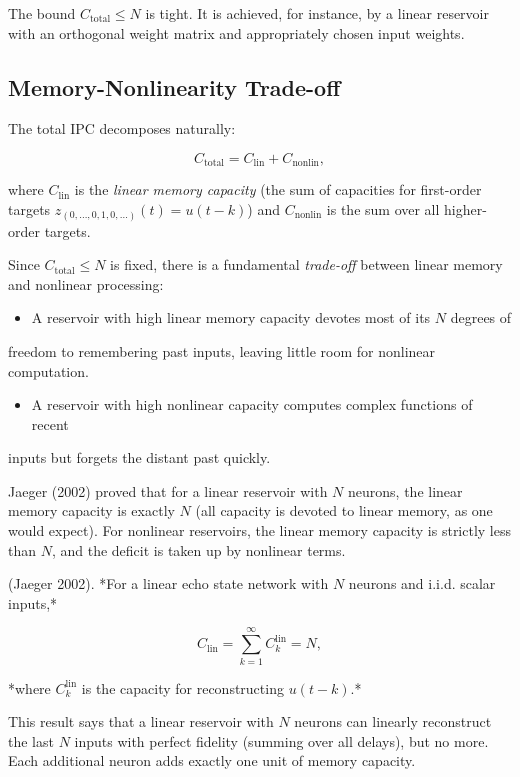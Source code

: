 \begin{remark}
The bound $C_{\text{total}} \leq N$ is tight. It is achieved, for
instance, by a linear reservoir with an orthogonal weight matrix and appropriately
chosen input weights.
\end{remark}


\subsection{Memory-Nonlinearity Trade-off}\label{sec:15.6.3}

The total IPC decomposes naturally:

\[
C_{\text{total}} = C_{\text{lin}} + C_{\text{nonlin}},
\]

where $C_{\text{lin}}$ is the \textit{linear memory capacity} (the sum of capacities for
first-order targets $z_{(0,\ldots,0,1,0,\ldots)}(t) = u(t-k)$) and $C_{\text{nonlin}}$
is the sum over all higher-order targets.

Since $C_{\text{total}} \leq N$ is fixed, there is a fundamental \textit{trade-off} between
linear memory and nonlinear processing:

\begin{itemize}[nosep]
  \item A reservoir with high linear memory capacity devotes most of its $N$ degrees of
\end{itemize}
  freedom to remembering past inputs, leaving little room for nonlinear computation.
\begin{itemize}[nosep]
  \item A reservoir with high nonlinear capacity computes complex functions of recent
\end{itemize}
  inputs but forgets the distant past quickly.

Jaeger (2002) proved that for a linear reservoir with $N$ neurons, the linear memory
capacity is exactly $N$ (all capacity is devoted to linear memory, as one would
expect). For nonlinear reservoirs, the linear memory capacity is strictly less than
$N$, and the deficit is taken up by nonlinear terms.

\begin{proposition}\label{prop:15.20}
(Jaeger 2002). *For a linear echo state network with $N$
neurons and i.i.d. scalar inputs,*

\[
C_{\text{lin}} = \sum_{k=1}^{\infty} C_k^{\text{lin}} = N,
\]

*where $C_k^{\text{lin}}$ is the capacity for reconstructing $u(t-k)$.*

This result says that a linear reservoir with $N$ neurons can linearly reconstruct the
last $N$ inputs with perfect fidelity (summing over all delays), but no more. Each
additional neuron adds exactly one unit of memory capacity.
\end{proposition}


